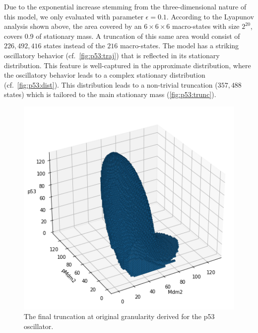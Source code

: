 Due to the exponential increase stemming from the three-dimension\-al nature of this model, we only evaluated with parameter $\epsilon=0.1$.
According to the Lyapunov analysis shown above, the area covered by an $6\times 6\times 6$ macro-states with size $2^{20}$, covers 0.9 of stationary mass.
A truncation of this same area would consist of $226,492,416$ states instead of the $216$ macro-states.
The model has a striking oscillatory behavior (cf.\ \autoref{fig:p53:traj}) that is reflected in its stationary distribution.
This feature is well-captured in the approximate distribution, where the oscillatory behavior leads to a complex stationary distribution (cf.\ \autoref{fig:p53:dist}).
This distribution leads to a non-trivial truncation ($357,488$ states) which is tailored to the main stationary mass (\autoref{fig:p53:trunc}).
\begin{figure}[htb]
    \centering
    \begin{minipage}{0.9\textwidth}
    \centering
    \includegraphics[width=\textwidth]{gfx/p53_trunc.png}
    \end{minipage}
\caption{The final truncation at original granularity derived for the p53 oscillator.}
\label{fig:p53:trunc}
\end{figure}
